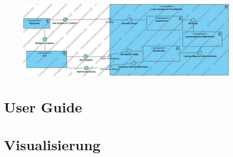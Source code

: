 \documentclass[12pt]{book}
\begin{document}
    
    \begin{figure}[ht!]
        \centering
        \includegraphics[width=\textwidth]{images/Component_Diagram1.jpg}
    \end{figure}
    
    
    
    
    
    
    
    
    
    
    
    \section*{User Guide}
    
    
    
    
    
    \section*{Visualisierung}
    
    
    
    
    
    
    
\end{document}
